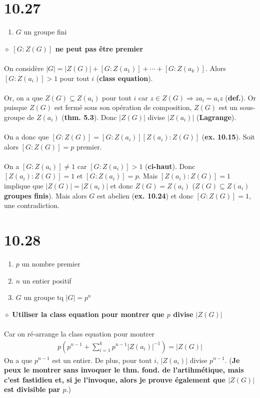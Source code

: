 \documentclass[a4paper,10pt]{article}
\begin{document}
\section*{10.27}
\begin{enumerate}
 \item $G$ un groupe fini
\end{enumerate}
$\diamond$ \textbf{$[G:Z(G)]$ ne peut pas être premier}
\\
\\
On considère $|G| = |Z(G)| + [G:Z(a_1)] + \cdots + [G:Z(a_k)]$. Alors $[G:Z(a_i)] > 1$ pour tout $i$ (\textbf{class equation}).
\\
\\
Or, on a que $Z(G) \subseteq Z(a_i)$ pour tout $i$ car $z \in Z(G) \Rightarrow za_i = a_iz$ (\textbf{def.}). Or puisque $Z(G)$
est fermé sous son opération de composition, $Z(G)$ est un sous-groupe de $Z(a_i)$ (\textbf{thm. 5.3}). Donc $|Z(G)|$ divise $|Z(a_i)|$ 
(\textbf{Lagrange}). 
\\
\\
On a donc que $[G:Z(G)] = [G:Z(a_i)][Z(a_i):Z(G)]$ (\textbf{ex. 10.15}). Soit alors $[G:Z(G)] = p$ premier.
\\
\\
On a $[G:Z(a_i)] \not = 1$ car $[G:Z(a_i)] > 1$ (\textbf{ci-haut}). Donc $[Z(a_i):Z(G)] = 1$ et  $[G:Z(a_i)] = p$. 
Mais $[Z(a_i):Z(G)] = 1$ implique que $|Z(G)| = |Z(a_i)|$ et donc $Z(G) = Z(a_i)$ (\textbf{$Z(G) \subseteq Z(a_i)$ groupes finis}). 
Mais alors $G$ est abelien (\textbf{ex. 10.24}) et donc $[G:Z(G)] = 1$, une contradiction.

\section*{10.28}
\begin{enumerate}
 \item $p$ un nombre premier
 \item $n$ un entier positif
 \item $G$ un groupe tq $|G| = p^n$
\end{enumerate}
$\diamond$ \textbf{Utiliser la class equation pour montrer que $p$ divise $|Z(G)|$}
\\
\\
Car on ré-arrange la class equation pour montrer
\begin{align*}
 p(p^{n-1} + \sum_{i=1}^k p^{n-1} |Z(a_i)|^{-1}) = |Z(G)|
\end{align*}
On a que $p^{n-1}$ est un entier. De plus, pour tout $i$, $|Z(a_i)|$ divise $p^{n-1}$. (\textbf{Je peux le montrer sans invoquer 
le thm. fond. de l'artihmétique, mais c'est fastidieu et, si je l'invoque, alors je prouve également que $|Z(G)|$ est divisible par $p$}.) 
\end{document}
